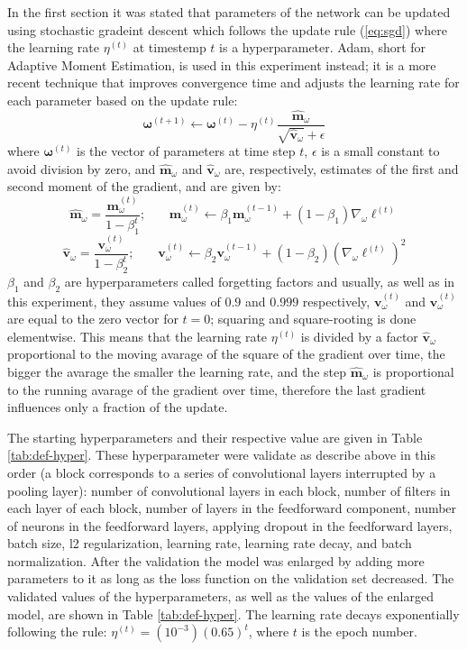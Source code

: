 \documentclass[12pt]{article}
\newcommand{\vect}[1]{\boldsymbol{#1}}
\begin{document}
In the first section it was stated that parameters of the network can be updated using stochastic gradeint descent which follows the update rule (\ref{eq:sgd}) where the learning rate $\eta^{(t)}$ at timestemp $t$ is a hyperparameter. Adam, short for Adaptive Moment Estimation, is used in this experiment instead; it is a more recent technique that improves convergence time and adjusts the learning rate for each parameter based on the update rule:
$$
\vect{\omega}^{(t+1)}\leftarrow \vect{\omega}^{(t)}-\eta^{(t)} {\frac {\vect{{\hat {m}}}_{\omega}}{{\sqrt {\vect{{\hat {v}}}_{\omega}}}+\epsilon }}
$$
where $\vect{\omega}^{(t)}$ is the vector of parameters at time step $t$, $\epsilon$ is a small constant to avoid division by zero, and	 $\vect{{\hat {m}}}_{\omega}$ and $\vect{{\hat {v}}}_{\omega}$ are, respectively, estimates of the first and second moment of the gradient, and are given by:
$$
\vect{\hat {m}}_{\omega}={\frac {\vect{m}_{\omega}^{(t)}}{1-\beta _{1}^{t}}} \text{;}\qquad
\vect{m}_{\omega}^{(t)}\leftarrow \beta _{1}\vect{m}_{\omega}^{(t-1)}+(1-\beta _{1})\nabla _{\omega}\ell^{(t)}
$$
$$
\vect{\hat {v}}_{\omega}={\frac {\vect{v}_{\omega}^{(t)}}{1-\beta _{2}^{t}}} \text{;}\qquad
\vect{v}_{\omega}^{(t)}\leftarrow \beta _{2}\vect{v}_{\omega}^{(t-1)}+(1-\beta _{2})(\nabla _{\omega}\ell^{(t)})^2
$$
$\beta_{1}$ and $\beta_{2}$ are hyperparameters called forgetting factors and usually, as well as in this experiment, they assume values of $0.9$ and $0.999$ respectively, $ \vect{v}_{\omega}^{(t)}$ and $ \vect{v}_{\omega}^{(t)}$ are equal to the zero vector for $t=0$; squaring and square-rooting is done elementwise. This means that the learning rate $\eta^{(t)}$ is divided by a factor $\vect{\hat {v}}_{\omega}$ proportional to the moving avarage of the square of the gradient over time, the bigger the avarage the smaller the learning rate, and the step $\vect{\hat {m}}_{\omega}$ is proportional to the running avarage of the gradient over time, therefore the last gradient influences only a fraction of the update.

The starting hyperparameters and their respective value are given in Table \ref{tab:def-hyper}. These hyperparameter were validate as describe above in this order (a block corresponds to a series of convolutional layers interrupted by a pooling layer): number of convolutional layers in each block, number of filters in each layer of each block, number of layers in the feedforward component, number of neurons in the feedforward layers, applying dropout in the feedforward layers, batch size, l2 regularization, learning rate, learning rate decay, and batch normalization. After the validation the model was enlarged by adding more parameters to it as long as the loss function on the validation set decreased. The validated values of the hyperparameters, as well as the values of the enlarged model, are shown in Table \ref{tab:def-hyper}. The learning rate decays exponentially following the rule: $ \eta^{(t)} = (10^{-3})(0.65)^{t} $, where $t$ is the epoch number.
\end{document}
